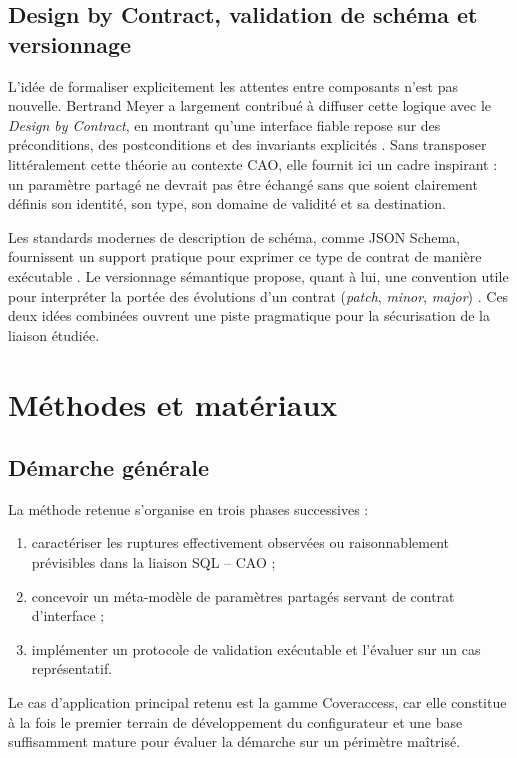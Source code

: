 \subsection{Design by Contract, validation de schéma et versionnage}

L'idée de formaliser explicitement les attentes entre composants n'est pas nouvelle. Bertrand Meyer a largement contribué à diffuser cette logique avec le \textit{Design by Contract}, en montrant qu'une interface fiable repose sur des préconditions, des postconditions et des invariants explicités \cite{meyer1997}. Sans transposer littéralement cette théorie au contexte CAO, elle fournit ici un cadre inspirant : un paramètre partagé ne devrait pas être échangé sans que soient clairement définis son identité, son type, son domaine de validité et sa destination.

Les standards modernes de description de schéma, comme JSON Schema, fournissent un support pratique pour exprimer ce type de contrat de manière exécutable \cite{jsonschema2020}. Le versionnage sémantique propose, quant à lui, une convention utile pour interpréter la portée des évolutions d'un contrat (\textit{patch}, \textit{minor}, \textit{major}) \cite{semver2013}. Ces deux idées combinées ouvrent une piste pragmatique pour la sécurisation de la liaison étudiée.

\section{Méthodes et matériaux}

\subsection{Démarche générale}

La méthode retenue s'organise en trois phases successives :

\begin{enumerate}[leftmargin=1.4cm]
\item caractériser les ruptures effectivement observées ou raisonnablement prévisibles dans la liaison SQL -- CAO ;
\item concevoir un méta-modèle de paramètres partagés servant de contrat d'interface ;
\item implémenter un protocole de validation exécutable et l'évaluer sur un cas représentatif.
\end{enumerate}

Le cas d'application principal retenu est la gamme Coveraccess, car elle constitue à la fois le premier terrain de développement du configurateur et une base suffisamment mature pour évaluer la démarche sur un périmètre maîtrisé.

